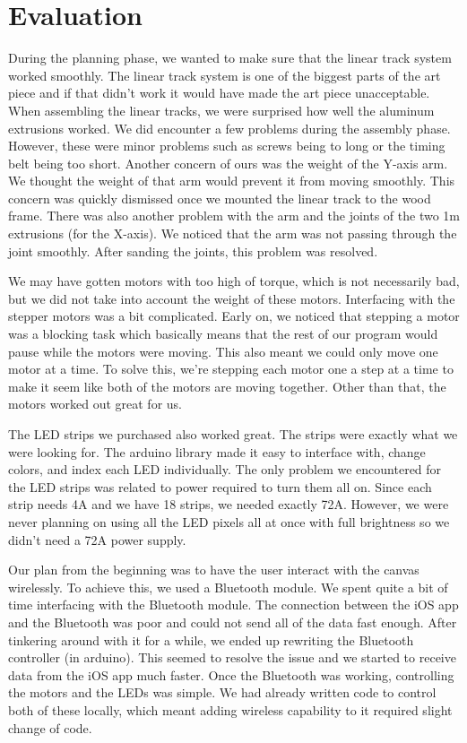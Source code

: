\documentclass[12pt]{article}
\begin{document}
\section{Evaluation}
During the planning phase, we wanted to make sure that the linear track system worked smoothly. The linear track system is one of the biggest parts of the art piece and if that didn’t work it would have made the art piece unacceptable. When assembling the linear tracks, we were surprised how well the aluminum extrusions worked. We did encounter a few problems during the assembly phase. However, these were minor problems such as screws being to long or the timing belt being too short. Another concern of ours was the weight of the Y-axis arm. We thought the weight of that arm would prevent it from moving smoothly. This concern was quickly dismissed once we mounted the linear track to the wood frame. There was also another problem with the arm and the joints of the two 1m extrusions (for the X-axis). We noticed that the arm was not passing through the joint smoothly. After sanding the joints, this problem was resolved. 

We may have gotten motors with too high of torque, which is not necessarily bad, but we did not take into account the weight of these motors. Interfacing with the stepper motors was a bit complicated. Early on, we noticed that stepping a motor was a blocking task which basically means that the rest of our program would pause while the motors were moving. This also meant we could only move one motor at a time. To solve this, we’re stepping each motor one a step at a time to make it seem like both of the motors are moving together. Other than that, the motors worked out great for us.

The LED strips we purchased also worked great. The strips were exactly what we were looking for. The arduino library made it easy to interface with, change colors, and index each LED individually. The only problem we encountered for the LED strips was related to power required to turn them all on. Since each strip needs 4A and we have 18 strips, we needed exactly 72A. However, we were never planning on using all the LED pixels all at once with full brightness so we didn’t need a 72A power supply.

Our plan from the beginning was to have the user interact with the canvas wirelessly. To achieve this, we used a Bluetooth module. We spent quite a bit of time interfacing with the Bluetooth module. The connection between the iOS app and the Bluetooth was poor and could not send all of the data fast enough. After tinkering around with it for a while, we ended up rewriting the Bluetooth controller (in arduino). This seemed to resolve the issue and we started to receive data from the iOS app much faster. Once the Bluetooth was working, controlling the motors and the LEDs was simple. We had already written code to control both of these locally, which meant adding wireless capability to it required slight change of code.
\end{document}

